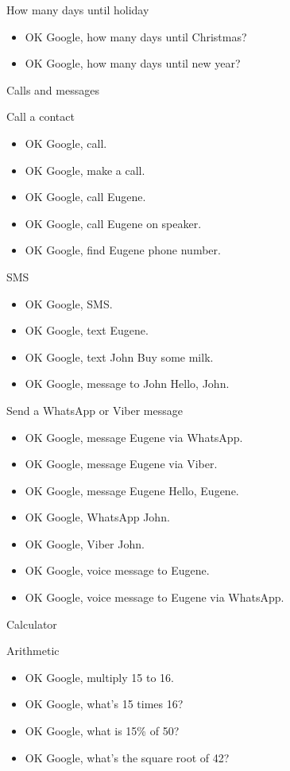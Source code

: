 \documentclass[
  a4paper,
]{article}
\providecommand{\tightlist}{%
  \setlength{\itemsep}{0pt}\setlength{\parskip}{0pt}}\usepackage{longtable,booktabs,array}
\begin{document}
How many days until holiday

\begin{itemize}
\tightlist
\item
  OK Google, how many days until Christmas?
\item
  OK Google, how many days until new year?
\end{itemize}

Calls and messages

Call a contact

\begin{itemize}
\tightlist
\item
  OK Google, call.
\item
  OK Google, make a call.
\item
  OK Google, call Eugene.
\item
  OK Google, call Eugene on speaker.
\item
  OK Google, find Eugene phone number.
\end{itemize}

SMS

\begin{itemize}
\tightlist
\item
  OK Google, SMS.
\item
  OK Google, text Eugene.
\item
  OK Google, text John Buy some milk.
\item
  OK Google, message to John Hello, John.
\end{itemize}

Send a WhatsApp or Viber message

\begin{itemize}
\tightlist
\item
  OK Google, message Eugene via WhatsApp.
\item
  OK Google, message Eugene via Viber.
\item
  OK Google, message Eugene Hello, Eugene.
\item
  OK Google, WhatsApp John.
\item
  OK Google, Viber John.
\item
  OK Google, voice message to Eugene.
\item
  OK Google, voice message to Eugene via WhatsApp.
\end{itemize}

Calculator

Arithmetic

\begin{itemize}
\tightlist
\item
  OK Google, multiply 15 to 16.
\item
  OK Google, what's 15 times 16?
\item
  OK Google, what is 15\% of 50?
\item
  OK Google, what's the square root of 42?
\end{itemize}
\end{document}
